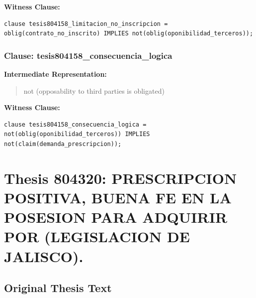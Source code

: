 \documentclass[11pt,a4paper]{article}
\begin{document}
\textbf{Witness Clause:}

\begin{lstlisting}[style=witnessstyle, language=Witness]
clause tesis804158_limitacion_no_inscripcion = oblig(contrato_no_inscrito) IMPLIES not(oblig(oponibilidad_terceros));
\end{lstlisting}

\subsubsection{Clause: tesis804158\_consecuencia\_logica}

\textbf{Intermediate Representation:}

\begin{quote}
not (opposability to third parties is obligated)
\end{quote}

\textbf{Witness Clause:}

\begin{lstlisting}[style=witnessstyle, language=Witness]
clause tesis804158_consecuencia_logica = not(oblig(oponibilidad_terceros)) IMPLIES not(claim(demanda_prescripcion));
\end{lstlisting}

\newpage

\section{Thesis 804320: PRESCRIPCION POSITIVA, BUENA FE EN LA POSESION PARA ADQUIRIR POR (LEGISLACION DE JALISCO).}
\label{thesis:804320}

\subsection{Original Thesis Text}
\end{document}
